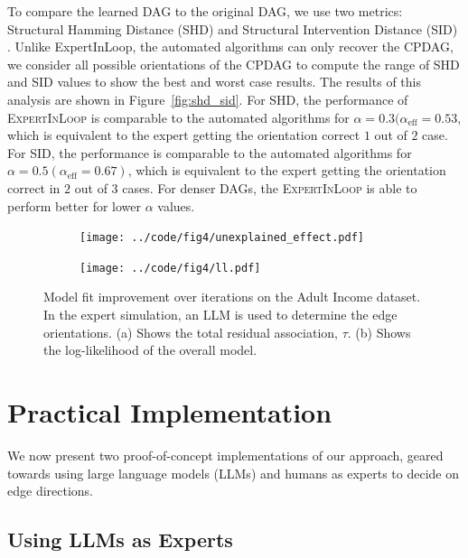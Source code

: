 \documentclass{uai2025} %
\begin{document}
To compare the learned DAG to the original DAG, we use two metrics: Structural
Hamming Distance (SHD) and Structural Intervention Distance (SID)
\citep{Peters2015}. Unlike \textrm{ExpertInLoop}, the automated algorithms can
only recover the CPDAG, we consider all possible orientations of the CPDAG to
compute the range of SHD and SID values to show the best and worst case
results. The results of this analysis are shown in Figure~\ref{fig:shd_sid}.
For SHD, the performance of \textsc{ExpertInLoop} is comparable to the
automated algorithms for $ \alpha = 0.3 (\alpha_{\textrm{eff}} = 0.53 $, which
is equivalent to the expert getting the orientation correct $ 1 $ out of $ 2 $
case. For SID, the performance is comparable to the automated algorithms for $
\alpha = 0.5 (\alpha_{\textrm{eff}} = 0.67) $, which is equivalent to the
expert getting the orientation correct in $ 2 $ out of $ 3 $ cases. For denser
DAGs, the \textsc{ExpertInLoop} is able to perform better for lower $ \alpha $
values.


\begin{figure}[t!]
	\begin{subfigure}{0.25\textwidth}
		\centering
		\texttt{[image: ../code/fig4/unexplained\_effect.pdf]}
		\caption{}
	\end{subfigure}%
	\begin{subfigure}{0.25\textwidth}
		\centering
		\texttt{[image: ../code/fig4/ll.pdf]}
		\caption{}
	\end{subfigure}
	\caption{Model fit improvement over iterations on the Adult Income dataset. In the expert simulation, an 
		LLM is used to determine the edge orientations. (a) Shows the total residual association, $\tau$. 
		(b) Shows the log-likelihood of the overall model.
	}
	\label{fig:unexplained_ll}
\end{figure}

\section{Practical Implementation}

\label{sec:web}

We now present two proof-of-concept implementations of our approach, 
geared towards using  large language models (LLMs) and humans as experts
to decide on edge directions.

\subsection{Using LLMs as Experts}
 
\end{document}
